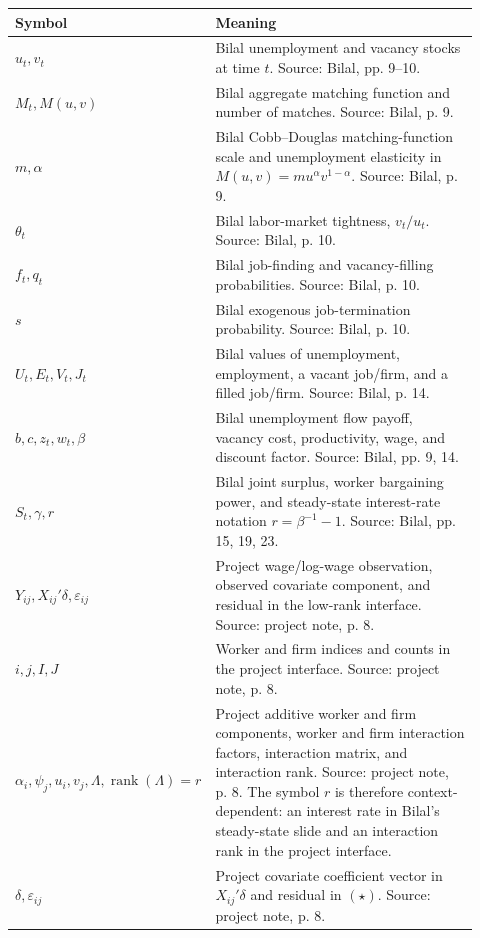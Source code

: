 \documentclass[11pt]{article}
\newcommand{\1}{\mathbf{1}}
\begin{document}
\begin{center}
\begin{tabular}{>{\raggedright\arraybackslash}p{0.24\linewidth}
                >{\raggedright\arraybackslash}p{0.68\linewidth}}
\toprule
Symbol & Meaning \\
\midrule
$u_t,v_t$ & Bilal unemployment and vacancy stocks at time $t$. Source: Bilal, pp. 9--10. \\
$M_t,M(u,v)$ & Bilal aggregate matching function and number of matches. Source: Bilal, p. 9. \\
$m,\alpha$ & Bilal Cobb--Douglas matching-function scale and unemployment elasticity in $M(u,v)=mu^\alpha v^{1-\alpha}$. Source: Bilal, p. 9. \\
$\theta_t$ & Bilal labor-market tightness, $v_t/u_t$. Source: Bilal, p. 10. \\
$f_t,q_t$ & Bilal job-finding and vacancy-filling probabilities. Source: Bilal, p. 10. \\
$s$ & Bilal exogenous job-termination probability. Source: Bilal, p. 10. \\
$U_t,E_t,V_t,J_t$ & Bilal values of unemployment, employment, a vacant job/firm, and a filled job/firm. Source: Bilal, p. 14. \\
$b,c,z_t,w_t,\beta$ & Bilal unemployment flow payoff, vacancy cost, productivity, wage, and discount factor. Source: Bilal, pp. 9, 14. \\
$S_t,\gamma,r$ & Bilal joint surplus, worker bargaining power, and steady-state interest-rate notation $r=\beta^{-1}-1$. Source: Bilal, pp. 15, 19, 23. \\
$Y_{ij},X_{ij}'\delta,\varepsilon_{ij}$ & Project wage/log-wage observation, observed covariate component, and residual in the low-rank interface. Source: project note, p. 8. \\
$i,j,I,J$ & Worker and firm indices and counts in the project interface. Source: project note, p. 8. \\
$\alpha_i,\psi_j,u_i,v_j,\Lambda,\operatorname{rank}(\Lambda)=r$ & Project additive worker and firm components, worker and firm interaction factors, interaction matrix, and interaction rank. Source: project note, p. 8. The symbol $r$ is therefore context-dependent: an interest rate in Bilal's steady-state slide and an interaction rank in the project interface. \\
$\delta,\varepsilon_{ij}$ & Project covariate coefficient vector in $X_{ij}'\delta$ and residual in $(\star)$. Source: project note, p. 8. \\

\end{tabular}
\end{center}
\end{document}
